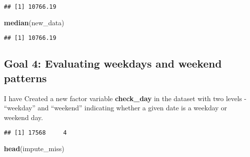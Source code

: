 \documentclass[]{article}
\newenvironment{Shaded}{\begin{snugshade}}{\end{snugshade}}
\newcommand{\KeywordTok}[1]{\textcolor[rgb]{0.13,0.29,0.53}{\textbf{#1}}}
\newcommand{\StringTok}[1]{\textcolor[rgb]{0.31,0.60,0.02}{#1}}
\newcommand{\ControlFlowTok}[1]{\textcolor[rgb]{0.13,0.29,0.53}{\textbf{#1}}}
\newcommand{\OperatorTok}[1]{\textcolor[rgb]{0.81,0.36,0.00}{\textbf{#1}}}
\newcommand{\NormalTok}[1]{#1}
\begin{document}
\begin{verbatim}
## [1] 10766.19
\end{verbatim}

\begin{Shaded}
\begin{Highlighting}[]
\KeywordTok{median}\NormalTok{(new_data)}
\end{Highlighting}
\end{Shaded}

\begin{verbatim}
## [1] 10766.19
\end{verbatim}

\subsection{Goal 4: Evaluating weekdays and weekend
patterns}\label{goal-4-evaluating-weekdays-and-weekend-patterns}

I have Created a new factor variable \textbf{check\_day} in the dataset
with two levels - ``weekday'' and ``weekend'' indicating whether a given
date is a weekday or weekend day.

\begin{Shaded}
\end{Shaded}

\begin{verbatim}
## [1] 17568     4
\end{verbatim}

\begin{Shaded}
\begin{Highlighting}[]
\KeywordTok{head}\NormalTok{(impute_miss)}
\end{Highlighting}
\end{Shaded}
\end{document}
